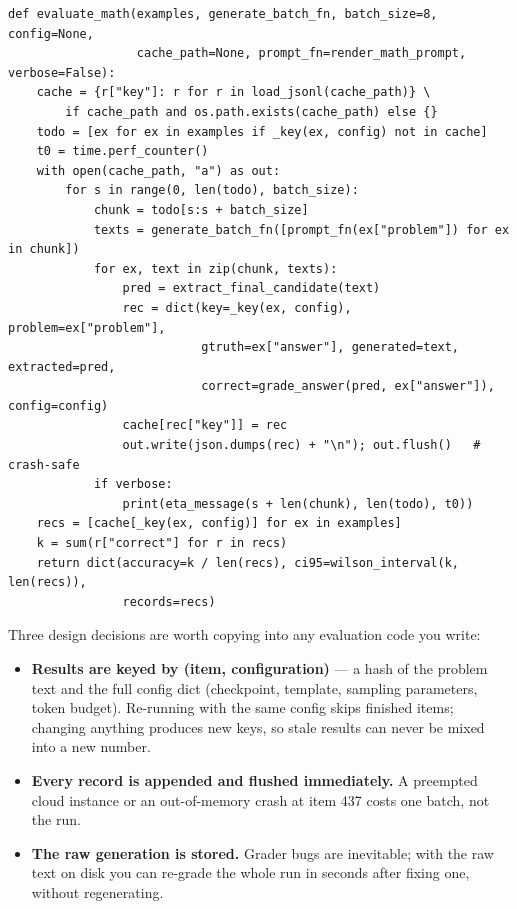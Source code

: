 \begin{lstlisting}[caption={A batched, resumable evaluation harness (condensed).},label={lst:eval:harness}]
def evaluate_math(examples, generate_batch_fn, batch_size=8, config=None,
                  cache_path=None, prompt_fn=render_math_prompt, verbose=False):
    cache = {r["key"]: r for r in load_jsonl(cache_path)} \
        if cache_path and os.path.exists(cache_path) else {}
    todo = [ex for ex in examples if _key(ex, config) not in cache]
    t0 = time.perf_counter()
    with open(cache_path, "a") as out:
        for s in range(0, len(todo), batch_size):
            chunk = todo[s:s + batch_size]
            texts = generate_batch_fn([prompt_fn(ex["problem"]) for ex in chunk])
            for ex, text in zip(chunk, texts):
                pred = extract_final_candidate(text)
                rec = dict(key=_key(ex, config), problem=ex["problem"],
                           gtruth=ex["answer"], generated=text, extracted=pred,
                           correct=grade_answer(pred, ex["answer"]), config=config)
                cache[rec["key"]] = rec
                out.write(json.dumps(rec) + "\n"); out.flush()   # crash-safe
            if verbose:
                print(eta_message(s + len(chunk), len(todo), t0))
    recs = [cache[_key(ex, config)] for ex in examples]
    k = sum(r["correct"] for r in recs)
    return dict(accuracy=k / len(recs), ci95=wilson_interval(k, len(recs)),
                records=recs)
\end{lstlisting}

Three design decisions are worth copying into any evaluation code you write:

\begin{itemize}
  \item \textbf{Results are keyed by (item, configuration)} --- a hash of the problem text and the
  full config dict (checkpoint, template, sampling parameters, token budget). Re-running with the
  same config skips finished items; changing anything produces new keys, so stale results can
  never be mixed into a new number.
  \item \textbf{Every record is appended and flushed immediately.} A preempted cloud instance or
  an out-of-memory crash at item 437 costs one batch, not the run.
  \item \textbf{The raw generation is stored.} Grader bugs are inevitable; with the raw text on
  disk you can re-grade the whole run in seconds after fixing one, without regenerating.
\end{itemize}

